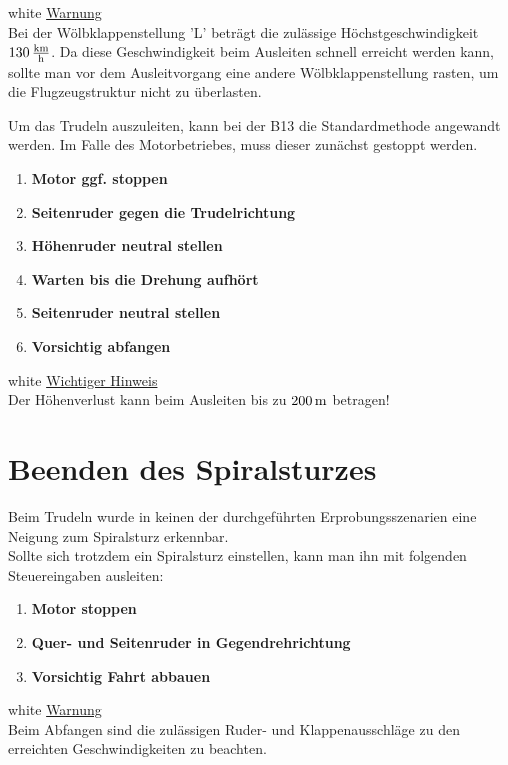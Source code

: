 \begin{color}{white} 
\underline{Warnung}\\
Bei der Wölbklappenstellung 'L' beträgt die zulässige Höchstgeschwindigkeit $\unit[130]{\frac{km}{h}}$. Da diese Geschwindigkeit beim Ausleiten schnell erreicht werden kann, sollte man vor dem Ausleitvorgang eine andere Wölbklappenstellung rasten, um die Flugzeugstruktur nicht zu überlasten.\\
\end{color}


Um das Trudeln auszuleiten, kann bei der B13 die Standardmethode angewandt werden. Im Falle des Motorbetriebes, muss dieser zunächst gestoppt werden.

\begin{enumerate}
\item \textbf{Motor ggf. stoppen}
\item \textbf{Seitenruder gegen die Trudelrichtung}
\item \textbf{Höhenruder neutral stellen}
\item \textbf{Warten bis die Drehung aufhört}
\item \textbf{Seitenruder neutral stellen}
\item \textbf{Vorsichtig abfangen}
\end{enumerate}


\begin{color}{white}
\underline{Wichtiger Hinweis}\\
Der Höhenverlust kann beim Ausleiten bis zu $\unit[200]{m}$ betragen!
\end{color}

\section{Beenden des Spiralsturzes}
Beim Trudeln wurde in keinen der durchgeführten Erprobungsszenarien eine Neigung zum Spiralsturz erkennbar.\\
Sollte sich trotzdem ein Spiralsturz einstellen, kann man ihn mit folgenden Steuereingaben ausleiten:
\begin{enumerate}
\item \textbf{Motor stoppen}
\item \textbf{Quer- und Seitenruder in Gegendrehrichtung}
\item \textbf{Vorsichtig Fahrt abbauen}
\end{enumerate}

\begin{color}{white}
\underline{Warnung}\\
Beim Abfangen sind die zulässigen Ruder- und Klappenausschläge zu den erreichten Geschwindigkeiten zu beachten.
\end{color}

